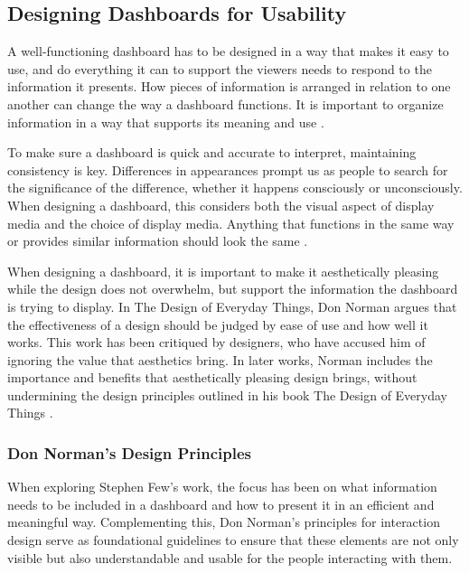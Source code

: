 \subsection{Designing Dashboards for Usability}
\label{subsec:designing_dashboards_for_usability}

A well-functioning dashboard has to be designed in a way that makes it easy to use, and do everything it can to support the viewers needs to respond to the information it presents. How pieces of information is arranged in relation to one another can change the way a dashboard functions. It is important to organize information in a way that supports its meaning and use \autocite[p. 139]{FewDashboard}.

To make sure a dashboard is quick and accurate to interpret, maintaining consistency is key. Differences in appearances prompt us as people to search for the significance of the difference, whether it happens consciously or unconsciously. When designing a dashboard, this considers both the visual aspect of display media and the choice of display media. Anything that functions in the same way or provides similar information should look the same \autocite[p. 143]{FewDashboard}.

When designing a dashboard, it is important to make it aesthetically pleasing while the design does not overwhelm, but support the information the dashboard is trying to display. In The Design of Everyday Things, Don Norman argues that the effectiveness of a design should be judged by ease of use and how well it works. This work has been critiqued by designers, who have accused him of ignoring the value that aesthetics bring. In later works, Norman includes the importance and benefits that aesthetically pleasing design brings, without undermining the design principles outlined in his book The Design of Everyday Things \autocite[p. 143]{FewDashboard}. 

\subsubsection{Don Norman's Design Principles}
\label{subsubsec:don_norman_design_principles}


When exploring Stephen Few’s work, the focus has been on what information needs to be included in a dashboard and how to present it in an efficient and meaningful way. Complementing this, Don Norman’s principles for interaction design serve as foundational guidelines to ensure that these elements are not only visible but also understandable and usable for the people interacting with them.

